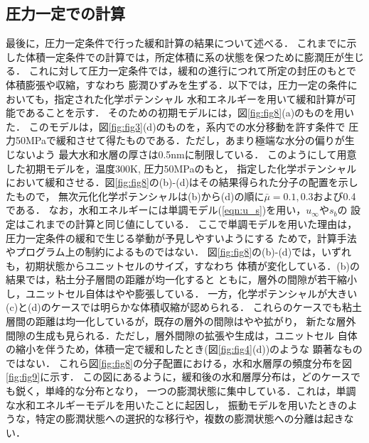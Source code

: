 \subsection{圧力一定での計算}
最後に，圧力一定条件で行った緩和計算の結果について述べる．
これまでに示した体積一定条件での計算では，所定体積に系の状態を保つために膨潤圧が生じる．
これに対して圧力一定条件では，緩和の進行につれて所定の封圧のもとで体積膨張や収縮，すなわち
膨潤ひずみを生ずる．以下では，圧力一定の条件においても，指定された化学ポテンシャル
水和エネルギーを用いて緩和計算が可能であることを示す．
そのための初期モデルには，図\ref{fig:fig8}(a)のものを用いた．
このモデルは，図\ref{fig:fig3}(d)のものを，系内での水分移動を許す条件で
圧力50MPaで緩和させて得たものである．ただし，あまり極端な水分の偏りが生じないよう
最大水和水層の厚さは0.5nmに制限している．
このようにして用意した初期モデルを，温度300K, 圧力50MPaのもと， 指定した化学ポテンシャル
において緩和させる．図\ref{fig:fig8}の(b)-(d)はその結果得られた分子の配置を示したもので，
無次元化化学ポテンシャルは(b)から(d)の順に$\bar{\mu}=0.1,0.3$および0.4である．
なお，水和エネルギーには単調モデル(\ref{eqn:u_s})を用い，$u_\infty$や$s_b$の
設定はこれまでの計算と同じ値にしている．
ここで単調モデルを用いた理由は，圧力一定条件の緩和で生じる挙動が予見しやすいようにする
ためで，計算手法やプログラム上の制約によるものではない．
図\ref{fig:fig8}の(b)-(d)では，いずれも，初期状態からユニットセルのサイズ，すなわち
体積が変化している．(b)の結果では，粘土分子層間の距離が均一化すると
ともに，層外の間隙が若干縮小し，ユニットセル自体はやや膨張している．
一方，化学ポテンシャルが大きい(c)と(d)のケースでは明らかな体積収縮が認められる．
これらのケースでも粘土層間の距離は均一化しているが，既存の層外の間隙はやや拡がり，
新たな層外間隙の生成も見られる．ただし，層外間隙の拡張や生成は，ユニットセル
自体の縮小を伴うため，体積一定で緩和したとき(図\ref{fig:fig4}(d))のような
顕著なものではない．
これら図\ref{fig:fig8}の分子配置における，水和水層厚の頻度分布を図\ref{fig:fig9}に示す．
この図にあるように，緩和後の水和層厚分布は，どのケースでも鋭く，単峰的な分布となり，
一つの膨潤状態に集中している．これは，単調な水和エネルギーモデルを用いたことに起因し，
振動モデルを用いたときのような，特定の膨潤状態への選択的な移行や，複数の膨潤状態への分離は起きない．

